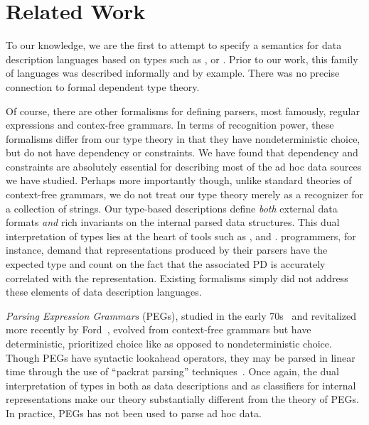\section{Related Work}
\label{sec:related}



To our knowledge, we are the first to attempt to specify a semantics for
data description languages based on types such as \packettypes,
\datascript{} or \pads.  Prior to our work, this family of languages 
was described informally and by example.  There was no precise
connection to formal dependent type theory.

Of course, there are other formalisms for
defining parsers, most famously, regular expressions and
contex-free grammars.  In terms of recognition power,
these formalisms differ from our type theory
in that they have nondeterministic choice, but do not have
dependency or constraints.  We have found that 
dependency and constraints are absolutely essential for
describing most of the ad hoc data sources we have studied.
Perhaps more importantly though, unlike standard theories of
context-free grammars,
we do not treat our type theory merely as a recognizer for
a collection of strings.  Our type-based descriptions 
define {\em both} external data formats {\em and} 
rich invariants on %
the internal parsed data structures.  This dual interpretation
of types lies at the heart of tools such as \pads, \datascript{} and
\packettypes.  \pads{} programmers, for instance, demand that
representations produced by their \pads{} parsers have the expected type and 
count on the fact that the associated PD is accurately correlated
with the representation.  Existing formalisms simply did not address
these elements of data description languages.

{\em Parsing Expression Grammars} (PEGs),
studied in the early 70s~\cite{birman+:parsing} and revitalized more 
recently by Ford~\cite{ford:pegs}, 
evolved from context-free grammars but
have deterministic, prioritized choice like \ddc{} as opposed to
nondeterministic choice.  Though PEGs have syntactic lookahead operators,
they may be parsed in linear time through the use of
``packrat parsing'' techniques~\cite{ford:packrat,grimm:packrat}.
Once again, the dual interpretation of types in \ddc{} both as
data descriptions and as classifiers for internal representations
make our theory substantially different from the theory of PEGs.
In practice, PEGs has not been used to parse ad hoc data.

